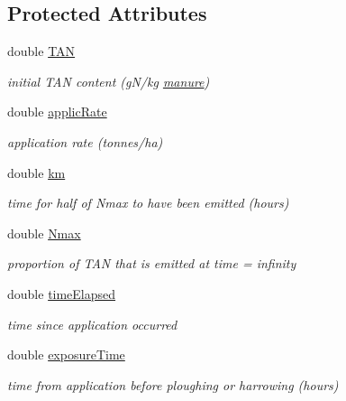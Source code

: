 \subsection*{Protected Attributes}
\begin{DoxyCompactItemize}
\item 
double \hyperlink{class_a_l_f_a_m_acc5733b478c6b2ff521d5a6c6de62093}{TAN}
\begin{DoxyCompactList}\small\item\em initial TAN content (gN/kg \hyperlink{classmanure}{manure}) \item\end{DoxyCompactList}\item 
double \hyperlink{class_a_l_f_a_m_a769eebe5366f8aeb9d1fec89e25b700d}{applicRate}
\begin{DoxyCompactList}\small\item\em application rate (tonnes/ha) \item\end{DoxyCompactList}\item 
double \hyperlink{class_a_l_f_a_m_a626af05172d7fc201f02eedcce3a6956}{km}
\begin{DoxyCompactList}\small\item\em time for half of Nmax to have been emitted (hours) \item\end{DoxyCompactList}\item 
double \hyperlink{class_a_l_f_a_m_a030ebc40137f179126b288109c88a01e}{Nmax}
\begin{DoxyCompactList}\small\item\em proportion of TAN that is emitted at time = infinity \item\end{DoxyCompactList}\item 
double \hyperlink{class_a_l_f_a_m_a533d0dbe340ecc6aebb7b2ff33a21cd4}{timeElapsed}
\begin{DoxyCompactList}\small\item\em time since application occurred \item\end{DoxyCompactList}\item 
double \hyperlink{class_a_l_f_a_m_a81ec0b0c6ed35efb1eaf48361ce984ff}{exposureTime}
\begin{DoxyCompactList}\small\item\em time from application before ploughing or harrowing (hours) \item\end{DoxyCompactList}\end{DoxyCompactItemize}


